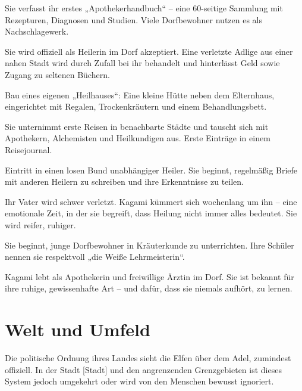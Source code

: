 \documentclass[12pt,a4paper]{article}
\begin{document}
\begin{multicols}{2}
\begin{description}[leftmargin=1.5cm, style=nextline, font=\normalfont\bfseries]
\item[18 Jahre]  
Sie verfasst ihr erstes „Apothekerhandbuch“ – eine 60-seitige Sammlung mit Rezepturen, Diagnosen und Studien. Viele Dorfbewohner nutzen es als Nachschlagewerk.

\item[19 Jahre]  
Sie wird offiziell als Heilerin im Dorf akzeptiert. Eine verletzte Adlige aus einer nahen Stadt wird durch Zufall bei ihr behandelt und hinterlässt Geld sowie Zugang zu seltenen Büchern.

\item[20 Jahre]  
Bau eines eigenen „Heilhauses“: Eine kleine Hütte neben dem Elternhaus, eingerichtet mit Regalen, Trockenkräutern und einem Behandlungsbett.

\item[21 Jahre]  
Sie unternimmt erste Reisen in benachbarte Städte und tauscht sich mit Apothekern, Alchemisten und Heilkundigen aus. Erste Einträge in einem Reisejournal.

\item[22 Jahre]  
Eintritt in einen losen Bund unabhängiger Heiler. Sie beginnt, regelmäßig Briefe mit anderen Heilern zu schreiben und ihre Erkenntnisse zu teilen.

\item[23 Jahre]  
Ihr Vater wird schwer verletzt. Kagami kümmert sich wochenlang um ihn – eine emotionale Zeit, in der sie begreift, dass Heilung nicht immer alles bedeutet. Sie wird reifer, ruhiger.

\item[24 Jahre]  
Sie beginnt, junge Dorfbewohner in Kräuterkunde zu unterrichten. Ihre Schüler nennen sie respektvoll „die Weiße Lehrmeisterin“.

\item[25 Jahre (Gegenwart)]  
Kagami lebt als Apothekerin und freiwillige Ärztin im Dorf. Sie ist bekannt für ihre ruhige, gewissenhafte Art – und dafür, dass sie niemals aufhört, zu lernen.

\end{description}
\end{multicols}


\newpage

\section{Welt und Umfeld}

Die politische Ordnung ihres Landes sieht die Elfen über dem Adel, zumindest offiziell. In der Stadt [Stadt] und den angrenzenden Grenzgebieten ist dieses System jedoch umgekehrt oder wird von den Menschen bewusst ignoriert.
\end{document}

